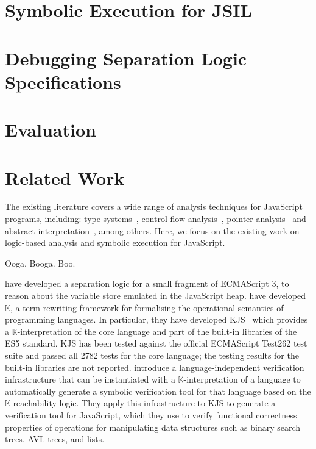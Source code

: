 \documentclass{llncs}
\newcommand{\jsil}{JSIL\xspace}
\newcommand{\myparagraph}[1]{\smallskip\noindent {\bf #1.}\hspace{1pt}}
\begin{document}
\newpage
\section{Symbolic Execution for \jsil}\label{sec:jsil:symb:exec}


\section{Debugging Separation Logic Specifications}\label{sec:specs}


\newpage
\section{Evaluation}


\newpage
\section{Related Work} 

The existing literature covers a wide range of analysis techniques for JavaScript programs, including: 
type systems~\cite{thiemann:esop:2005,anderson:ecoop:2005,jensen:sas:2009,typescript:toot:2014,feldthaus:oopsla:2014,bierman:ecoop:2014,rastogi:popl:2015},
control flow analysis~\cite{feldthaus2013efficient}, pointer analysis~\cite{jang2009points,sridharan:ecoop:12} and abstract
interpretation~\cite{kashyap:fse:14,jensen:sas:2009,andreasen:oopsla:2014,park:ecoop:15}, among others. 
Here, we focus on the existing work on logic-based analysis and symbolic execution for JavaScript. 

\myparagraph{Symbolic Execution} Ooga. Booga. Boo.




\myparagraph{Logic-based Analysis} 
%
\cite{gardner:popl:2012} have developed a separation logic for a small fragment of ECMAScript 3, to reason about the variable store emulated in the JavaScript heap.
%
\cite{rosu-serbanuta-2010-jlap} have developed $\mathbb{K}$, a term-rewriting framework  for  formalising the operational
semantics of programming languages.
 In particular, they have developed KJS~\cite{Park:2015} which provides a $\mathbb{K}$-interpretation of the core language and part of the built-in libraries of the ES5 standard. KJS has been tested against the official ECMAScript Test262 test suite and passed all 2782 tests for the core language; the testing results for the built-in libraries are not reported. 
\cite{stefanescu-park-yuwen-li-rosu-2016-oopsla} introduce a language-independent verification infrastructure 
that can be instantiated with a $\mathbb{K}$-interpretation of a  language to automatically generate a symbolic verification tool for that language based on the $\mathbb{K}$ reachability logic. They apply this infrastructure to KJS to generate a verification tool for JavaScript, which they use to verify functional correctness properties of operations for manipulating data structures such as binary search trees, AVL trees, and lists.
\end{document}
